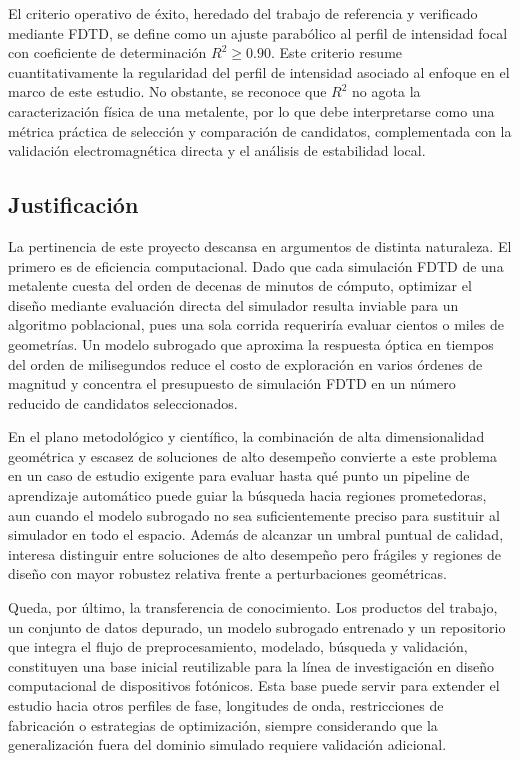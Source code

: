 El criterio operativo de éxito, heredado del trabajo de referencia y verificado mediante FDTD, se define como un ajuste parabólico al perfil de intensidad focal con coeficiente de determinación $R^2 \geq 0.90$. Este criterio resume cuantitativamente la regularidad del perfil de intensidad asociado al enfoque en el marco de este estudio. No obstante, se reconoce que $R^2$ no agota la caracterización física de una metalente, por lo que debe interpretarse como una métrica práctica de selección y comparación de candidatos, complementada con la validación electromagnética directa y el análisis de estabilidad local.

\subsection{Justificación}\label{subsec:justificacion}

La pertinencia de este proyecto descansa en argumentos de distinta naturaleza. El primero es de eficiencia computacional. Dado que cada simulación FDTD de una metalente cuesta del orden de decenas de minutos de cómputo, optimizar el diseño mediante evaluación directa del simulador resulta inviable para un algoritmo poblacional, pues una sola corrida requeriría evaluar cientos o miles de geometrías. Un modelo subrogado que aproxima la respuesta óptica en tiempos del orden de milisegundos reduce el costo de exploración en varios órdenes de magnitud y concentra el presupuesto de simulación FDTD en un número reducido de candidatos seleccionados.

En el plano metodológico y científico, la combinación de alta dimensionalidad geométrica y escasez de soluciones de alto desempeño convierte a este problema en un caso de estudio exigente para evaluar hasta qué punto un pipeline de aprendizaje automático puede guiar la búsqueda hacia regiones prometedoras, aun cuando el modelo subrogado no sea suficientemente preciso para sustituir al simulador en todo el espacio. Además de alcanzar un umbral puntual de calidad, interesa distinguir entre soluciones de alto desempeño pero frágiles y regiones de diseño con mayor robustez relativa frente a perturbaciones geométricas.

Queda, por último, la transferencia de conocimiento. Los productos del trabajo, un conjunto de datos depurado, un modelo subrogado entrenado y un repositorio que integra el flujo de preprocesamiento, modelado, búsqueda y validación, constituyen una base inicial reutilizable para la línea de investigación en diseño computacional de dispositivos fotónicos. Esta base puede servir para extender el estudio hacia otros perfiles de fase, longitudes de onda, restricciones de fabricación o estrategias de optimización, siempre considerando que la generalización fuera del dominio simulado requiere validación adicional.

